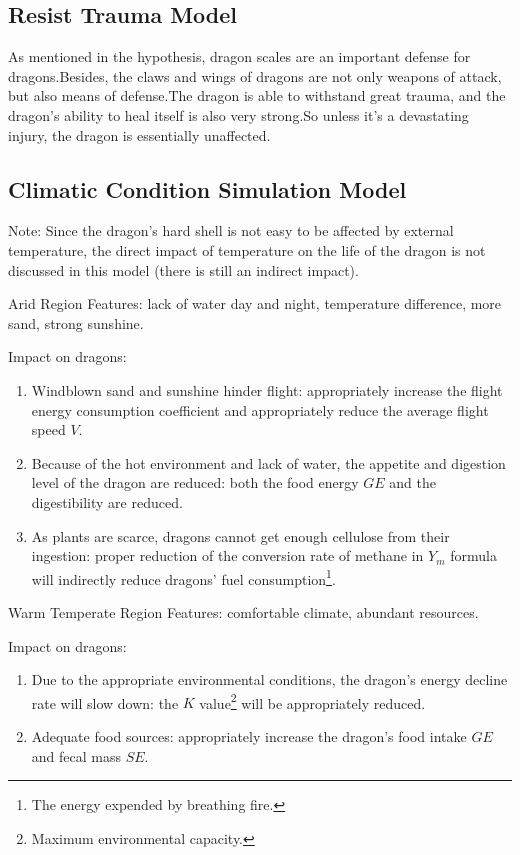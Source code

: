 \subsection{Resist Trauma Model}

As mentioned in the hypothesis, dragon scales are an important defense for dragons.Besides, the claws and wings of dragons are not only weapons of attack, but also means of defense.The dragon is able to withstand great trauma, and the dragon's ability to heal itself is also very strong.So unless it's a devastating injury, the dragon is essentially unaffected.

\subsection{Climatic Condition Simulation Model}

Note: Since the dragon's hard shell is not easy to be affected by external temperature, the direct impact of temperature on the life of the dragon is not discussed in this model (there is still an indirect impact).

\begin{defn}{Arid Region}
 Features: lack of water day and night, temperature difference, more sand, strong sunshine.
\end{defn}
\noindent
Impact on dragons:
\begin{enumerate}
    \item Windblown sand and sunshine hinder flight: appropriately increase the flight energy consumption coefficient and appropriately reduce the average flight speed $V$.
    \item Because of the hot environment and lack of water, the appetite and digestion level of the dragon are reduced: both the food energy $GE$ and the digestibility are reduced.
    \item As plants are scarce, dragons cannot get enough cellulose from their ingestion: proper reduction of the conversion rate of methane in $Y_m$ formula will indirectly reduce dragons' fuel consumption\footnote{The energy expended by breathing fire.}.
\end{enumerate}

\begin{defn}{Warm Temperate Region}
Features: comfortable climate, abundant resources.
\end{defn}
\noindent
Impact on dragons:
\begin{enumerate}[(1)]
    \item Due to the appropriate environmental conditions, the dragon's energy decline rate will slow down: the $K$ value\footnote{Maximum environmental capacity.} will be appropriately reduced.
    \item Adequate food sources: appropriately increase the dragon's food intake $GE$ and fecal mass $SE$.
\end{enumerate}


